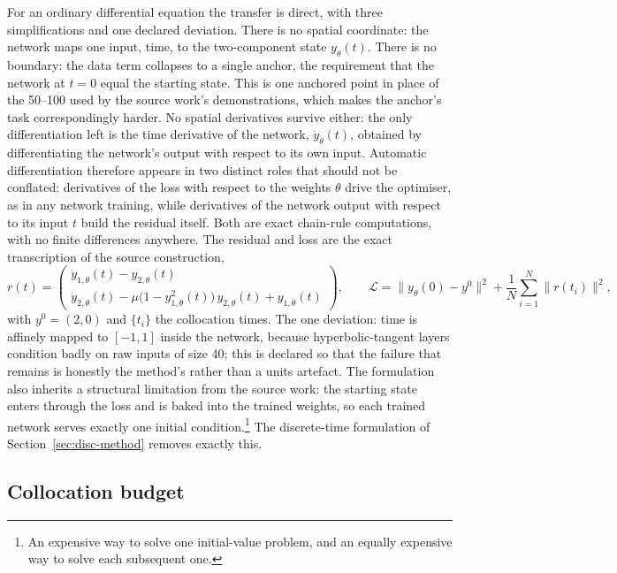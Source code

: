 \documentclass[11pt,a4paper]{article}
\begin{document}
For an ordinary differential equation the transfer is direct, with three
simplifications and one declared deviation. There is no spatial coordinate:
the network maps one input, time, to the two-component state
$y_\theta(t)$. There is no boundary: the data term collapses to a single
anchor, the requirement that the network at $t = 0$ equal the starting
state. This is one anchored point in place of the 50--100 used by the
source work's demonstrations, which makes the anchor's task
correspondingly harder. No spatial derivatives survive either: the only
differentiation left is the time derivative of the network,
$\dot y_\theta(t)$, obtained by differentiating the network's output with
respect to its own input. Automatic differentiation therefore appears in
two distinct roles that should not be conflated: derivatives of the loss
with respect to the weights $\theta$ drive the optimiser, as in any
network training, while derivatives of the network output with respect to
its input $t$ build the residual itself. Both are exact chain-rule
computations, with no finite differences anywhere. The residual and loss
are the exact transcription of the source construction,
\begin{equation}
  r(t) = \begin{pmatrix}
    \dot y_{1,\theta}(t) - y_{2,\theta}(t) \\[2pt]
    \dot y_{2,\theta}(t) - \mu\big(1 - y_{1,\theta}^2(t)\big)\,
      y_{2,\theta}(t) + y_{1,\theta}(t)
  \end{pmatrix},
  \qquad
  \mathcal{L} = \big\lVert y_\theta(0) - y^0 \big\rVert^2
  + \frac{1}{N}\sum_{i=1}^{N} \big\lVert r(t_i) \big\rVert^2 ,
  \label{eq:contloss}
\end{equation}
with $y^0 = (2,0)$ and $\{t_i\}$ the collocation times. The one deviation:
time is affinely mapped to $[-1,1]$ inside the network, because
hyperbolic-tangent layers condition badly on raw inputs of size 40; this is
declared so that the failure that remains is honestly the method's rather
than a units artefact. The formulation also inherits a structural
limitation from the source work: the starting state enters through the loss
and is baked into the trained weights, so each trained network serves
exactly one initial condition.\footnote{An expensive way to solve one
initial-value problem, and an equally expensive way to solve each
subsequent one.} The discrete-time formulation of
Section~\ref{sec:disc-method} removes exactly this.

\subsection{Collocation budget}
\label{sec:collocation}
\end{document}
